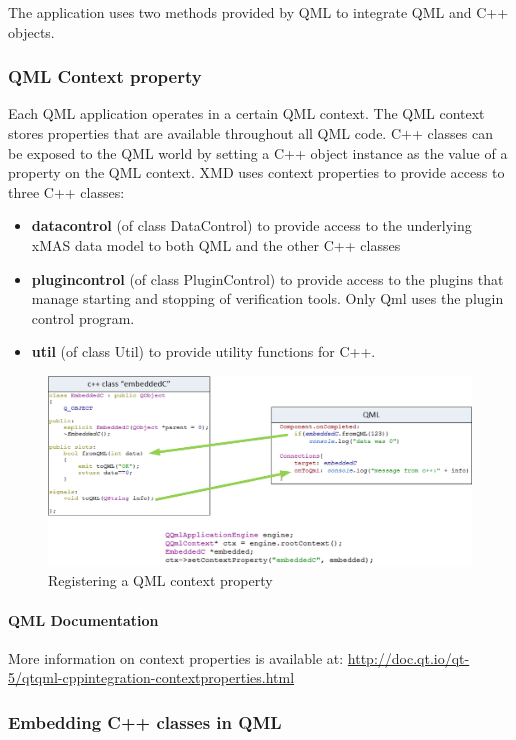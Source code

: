 The application uses two methods provided by QML to integrate QML and C++ objects.

\subsubsection{QML Context property}
Each QML application operates in a certain QML context. The QML context stores
properties that are available throughout all QML code. C++ classes can be exposed
to the QML world by setting a C++ object instance as the value of a property
on the QML context.
XMD uses context properties to provide access to three C++ classes:

\begin{itemize}
 \item \textbf{datacontrol} (of class DataControl) to provide access to the
 underlying xMAS data model to both QML and the other C++ classes
 \item \textbf{plugincontrol} (of class PluginControl) to provide access to
 the plugins that manage starting and stopping of verification tools. Only Qml
 uses the plugin control program.
 \item \textbf{util} (of class Util) to provide utility functions for C++.
\end{itemize}

\begin{figure}
    \includegraphics[width=\textwidth]{qml3}
    \caption{Registering a QML context property}
\end{figure}

\paragraph{QML Documentation}
More information on context properties is available at:
\url{http://doc.qt.io/qt-5/qtqml-cppintegration-contextproperties.html}


\subsubsection{Embedding C++ classes in QML}

